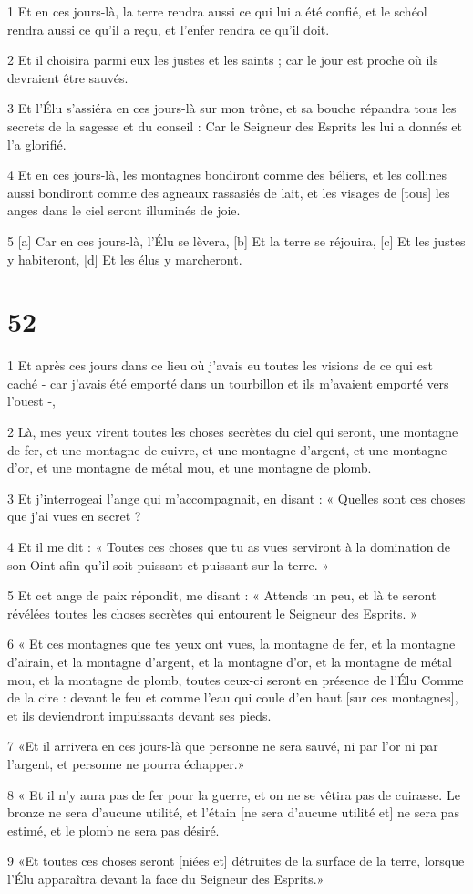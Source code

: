 \par 1 Et en ces jours-là, la terre rendra aussi ce qui lui a été confié, et le schéol rendra aussi ce qu'il a reçu, et l'enfer rendra ce qu'il doit.
\par 2 Et il choisira parmi eux les justes et les saints ; car le jour est proche où ils devraient être sauvés.
\par 3 Et l'Élu s'assiéra en ces jours-là sur mon trône, et sa bouche répandra tous les secrets de la sagesse et du conseil : Car le Seigneur des Esprits les lui a donnés et l'a glorifié.
\par 4 Et en ces jours-là, les montagnes bondiront comme des béliers, et les collines aussi bondiront comme des agneaux rassasiés de lait, et les visages de [tous] les anges dans le ciel seront illuminés de joie.
\par 5 [a] Car en ces jours-là, l'Élu se lèvera, [b] Et la terre se réjouira, [c] Et les justes y habiteront, [d] Et les élus y marcheront.

\chapter{52}

\par 1 Et après ces jours dans ce lieu où j'avais eu toutes les visions de ce qui est caché - car j'avais été emporté dans un tourbillon et ils m'avaient emporté vers l'ouest -,
\par 2 Là, mes yeux virent toutes les choses secrètes du ciel qui seront, une montagne de fer, et une montagne de cuivre, et une montagne d'argent, et une montagne d'or, et une montagne de métal mou, et une montagne de plomb.
\par 3 Et j'interrogeai l'ange qui m'accompagnait, en disant : « Quelles sont ces choses que j'ai vues en secret ?
\par 4 Et il me dit : « Toutes ces choses que tu as vues serviront à la domination de son Oint afin qu'il soit puissant et puissant sur la terre. »
\par 5 Et cet ange de paix répondit, me disant : « Attends un peu, et là te seront révélées toutes les choses secrètes qui entourent le Seigneur des Esprits. »
\par 6 « Et ces montagnes que tes yeux ont vues, la montagne de fer, et la montagne d'airain, et la montagne d'argent, et la montagne d'or, et la montagne de métal mou, et la montagne de plomb, toutes ceux-ci seront en présence de l'Élu Comme de la cire : devant le feu et comme l'eau qui coule d'en haut [sur ces montagnes], et ils deviendront impuissants devant ses pieds.
\par 7 «Et il arrivera en ces jours-là que personne ne sera sauvé, ni par l'or ni par l'argent, et personne ne pourra échapper.»
\par 8 « Et il n'y aura pas de fer pour la guerre, et on ne se vêtira pas de cuirasse. Le bronze ne sera d'aucune utilité, et l'étain [ne sera d'aucune utilité et] ne sera pas estimé, et le plomb ne sera pas désiré.
\par 9 «Et toutes ces choses seront [niées et] détruites de la surface de la terre, lorsque l'Élu apparaîtra devant la face du Seigneur des Esprits.»

